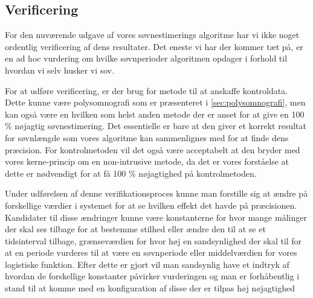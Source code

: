\subsection{Verificering}
For den nuværende udgave af vores søvnestimerings algoritme har vi ikke noget ordentlig verificering af dens resultater.
Det eneste vi har der kommer tæt på, er en ad hoc vurdering om hvilke søvnperioder algoritmen opdager i forhold til hvordan vi selv husker vi sov.

For at udføre verificering, er der brug for metode til at anskaffe kontroldata.
Dette kunne være polysomnografi som er præsenteret i \cref{sec:polysomnografi}, men kan også være en hvilken som helst anden metode der er anset for at give en 100 \% nøjagtig søvnestimering.
Det essentielle er bare at den giver et korrekt resultat for søvnlængde som vores algoritme kan sammenlignes med for at finde dens præcision.
For kontrolmetoden vil det også være acceptabelt at den bryder med vores kerne-princip om en non-intrusive metode, da det er vores forståelse at dette er nødvendigt for at få 100 \% nøjagtighed på kontrolmetoden.

Under udførelsen af denne verifikationsproces kunne man forstille sig at ændre på forskellige værdier i systemet for at se hvilken effekt det havde på præcisionen.
Kandidater til disse ændringer kunne være konstanterne for hvor mange målinger der skal ses tilbage for at bestemme stilhed eller ændre den til at se et tidsinterval tilbage, grænseværdien for hvor høj en sandsynlighed der skal til for at en periode vurderes til at være en søvnperiode eller middelværdien for vores logistiske funktion.
Efter dette er gjort vil man sandsynlig have et indtryk af hvordan de forskellige konstanter påvirker vurderingen og man er forhåbentlig i stand til at komme med en konfiguration af disse der er tilpas høj nøjagtighed 
